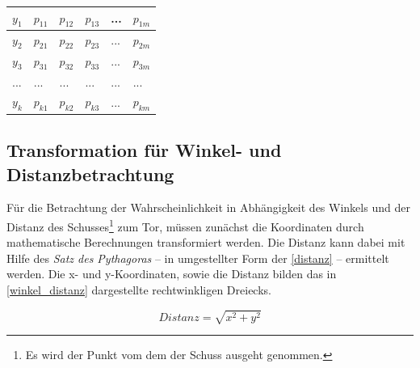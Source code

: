 \tablelasttail{}
\begin{center}%
\begin{supertabular}{ | P{3.2cm} | P{1.5cm} | P{1.5cm} | P{1.5cm} | P{1.5cm} |  P{1.5cm} |}
\textsf{$y_1$}	&   $p_{11}$	& 	$p_{12}$  &  $p_{13}$  &  ... &  $p_{1m}$\\
\hline
\textsf{$y_2$}	&   $p_{21}$	& 	$p_{22}$  &  $p_{23}$  &  ... &  $p_{2m}$\\
\hline
\textsf{$y_3$}	&   $p_{31}$	& 	$p_{32}$  &  $p_{33}$  &  ... &  $p_{3m}$\\
\hline
\textsf{...}	&   ...	        & 	...       &  ...        &  ... & ...\\
\hline
\textsf{$y_k$}	&   $p_{k1}$	& 	$p_{k2}$  &  $p_{k3}$  &  ... &  $p_{km	}$\\
\hline
\end{supertabular}
\end{center}




\subsection{Transformation für Winkel- und Distanzbetrachtung}
\label{wdt}
Für die Betrachtung der Wahrscheinlichkeit in Abhängigkeit des Winkels und der Distanz des Schusses\footnote{Es wird der Punkt vom dem der Schuss ausgeht genommen.} zum Tor, müssen zunächst die Koordinaten durch mathematische Berechnungen transformiert werden. Die Distanz kann dabei mit Hilfe des \textit{Satz des Pythagoras} -- in umgestellter Form der \vref{distanz} -- ermittelt werden. Die x- und y-Koordinaten, sowie die Distanz bilden das in \vref{winkel_distanz} dargestellte rechtwinkligen Dreiecks. 

\begin{equation}
\label{distanz}
Distanz= \sqrt{x^2 + y^2}
\end{equation}

